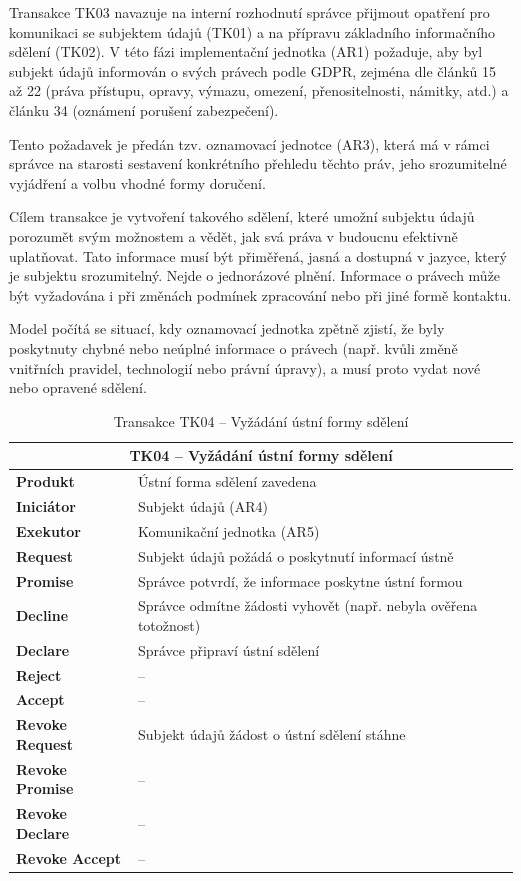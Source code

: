 \begin{itemize}
  Transakce TK03 navazuje na interní rozhodnutí správce přijmout opatření pro komunikaci se subjektem údajů (TK01) a na přípravu základního informačního sdělení (TK02). V této fázi implementační jednotka (AR1) požaduje, aby byl subjekt údajů informován o svých právech podle GDPR, zejména dle článků 15 až 22 (práva přístupu, opravy, výmazu, omezení, přenositelnosti, námitky, atd.) a článku 34 (oznámení porušení zabezpečení).

  Tento požadavek je předán tzv. oznamovací jednotce (AR3), která má v rámci správce na starosti sestavení konkrétního přehledu těchto práv, jeho srozumitelné vyjádření a volbu vhodné formy doručení.

  Cílem transakce je vytvoření takového sdělení, které umožní subjektu údajů porozumět svým možnostem a vědět, jak svá práva v budoucnu efektivně uplatňovat. Tato informace musí být přiměřená, jasná a dostupná v jazyce, který je subjektu srozumitelný. Nejde o jednorázové plnění. Informace o právech může být vyžadována i při změnách podmínek zpracování nebo při jiné formě kontaktu.

  Model počítá se situací, kdy oznamovací jednotka zpětně zjistí, že byly poskytnuty chybné nebo neúplné informace o právech (např. kvůli změně vnitřních pravidel, technologií nebo právní úpravy), a musí proto vydat nové nebo opravené sdělení.

  \begin{table}[H]
    \centering
    \renewcommand{\arraystretch}{1.2}
    \begin{tabular}{|p{3.1cm}|p{9.9cm}|}
    \hline
    \multicolumn{2}{|c|}{\textbf{TK04 – Vyžádání ústní formy sdělení}} \\
    \hline
    \textbf{Produkt} & Ústní forma sdělení zavedena  \\
    \hline
    \textbf{Iniciátor} & Subjekt údajů (AR4) \\
    \hline
    \textbf{Exekutor} & Komunikační jednotka (AR5) \\
    \hline
    \textbf{Request} & Subjekt údajů požádá o poskytnutí informací ústně \\
    \hline
    \textbf{Promise} & Správce potvrdí, že informace poskytne ústní formou \\
    \hline
    \textbf{Decline} & Správce odmítne žádosti vyhovět (např. nebyla ověřena totožnost) \\
    \hline
    \textbf{Declare} & Správce připraví ústní sdělení \\
    \hline
    \textbf{Reject} & – \\
    \hline
    \textbf{Accept} & – \\
    \hline
    \textbf{Revoke Request} & Subjekt údajů žádost o ústní sdělení stáhne \\
    \hline
    \textbf{Revoke Promise} & – \\
    \hline
    \textbf{Revoke Declare} & – \\
    \hline
    \textbf{Revoke Accept} & – \\
    \hline
    \end{tabular}
    \caption{Transakce TK04 – Vyžádání ústní formy sdělení}
  \end{table}
  

\end{itemize}
